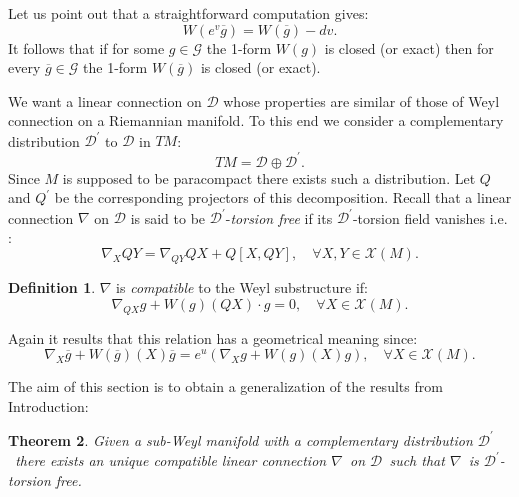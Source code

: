 \documentclass[11pt,oneside,english]{amsart}
\numberwithin{equation}{section}
\numberwithin{figure}{section}
\theoremstyle{plain}
\newtheorem{thm}{Theorem}[section]
\theoremstyle{definition}
\newtheorem{defn}[thm]{Definition}
\theoremstyle{definition}
\theoremstyle{plain}
\theoremstyle{plain}
\theoremstyle{remark}
\theoremstyle{remark}
\begin{document}
Let us point out that a straightforward computation gives: \[
W\left(e^{v}\overline{g}\right)=W\left(\overline{g}\right)-dv.\]
 It follows that if for some $g\in\mathcal{G}$ the 1-form $W\left(g\right)$
is closed (or exact) then for every $\overline{g}\in\mathcal{G}$
the 1-form $W\left(\overline{g}\right)$ is closed (or exact).

\medskip{}

We want a linear connection on $\mathcal{D}$ whose properties are
similar of those of Weyl connection on a Riemannian manifold. To this
end we consider a complementary distribution $\mathcal{D}^{\prime}$
to $\mathcal{D}$ in $TM$: \begin{equation}
TM=\mathcal{D}\oplus\mathcal{D}^{\prime}.\label{eq:3}\end{equation}
 Since $M$ is supposed to be paracompact there exists such a distribution.
Let $Q$ and $Q^{\prime}$ be the corresponding projectors of this
decomposition. Recall that a linear connection $\nabla$ on $\mathcal{D}$
is said to be $\mathcal{D}^{\prime}$-\textit{torsion free} if its
$\mathcal{D}^{\prime}$-torsion field vanishes i.e. \cite[p. 23]{b:f}:
\begin{equation}
\nabla_{X}QY=\nabla_{QY}QX+Q\left[X,QY\right],\quad\forall X,Y\in\mathcal{X}\left(M\right).\label{eq:4}\end{equation}

\begin{defn}
$\nabla$ is \textit{compatible} to the Weyl substructure if: \begin{equation}
\nabla_{QX}g+W\left(g\right)\left(QX\right)\cdot g=0,\quad\forall X\in\mathcal{X}\left(M\right).\label{eq:5}\end{equation}

\end{defn}
Again it results that this relation has a geometrical meaning since:
\[
\nabla_{X}\overline{g}+W\left(\overline{g}\right)\left(X\right)\overline{g}=e^{u}(\nabla_{X}g+W\left(g\right)\left(X\right)g),\quad\forall X\in\mathcal{X}\left(M\right).\]

The aim of this section is to obtain a generalization of the results
from Introduction:

\medskip{}

\begin{thm}
Given a sub-Weyl manifold with a complementary distribution $\mathcal{D}^{\prime}$\ there
exists an unique compatible linear connection $\nabla$\ on $\mathcal{D}$\ such
that $\nabla$\ is $\mathcal{D}^{\prime}$-torsion free.
\end{thm}
\medskip{}
\end{document}
